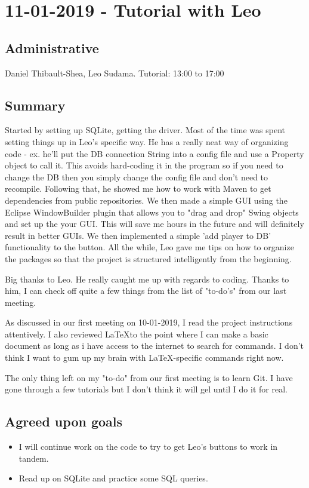 \documentclass[12pt]{article}
\begin{document}
	\section{11-01-2019 - Tutorial with Leo}
	
	\subsection{Administrative}
	Daniel Thibault-Shea, Leo Sudama.
	Tutorial: 13:00 to 17:00
	
	\subsection{Summary}
	Started by setting up SQLite, getting the driver. Most of the time was spent setting things up in Leo's specific way. He has a really neat way of organizing code - ex. he'll put the DB connection String into a config file and use a Property object to call it. This avoids hard-coding it in the program so if you need to change the DB then you simply change the config file and don't need to recompile. Following that, he showed me how to work with Maven to get dependencies from public repositories. We then made a simple GUI using the Eclipse WindowBuilder plugin that allows you to "drag and drop" Swing objects and set up the your GUI. This will save me hours in the future and will definitely result in better GUIs. We then implemented a simple 'add player to DB' functionality to the button. All the while, Leo gave me tips on how to organize the packages so that the project is structured intelligently from the beginning.
	
	Big thanks to Leo. He really caught me up with regards to coding. Thanks to him, I can check off quite a few things from the list of "to-do's" from our last meeting.
	
	As discussed in our first meeting on 10-01-2019, I read the project instructions attentively. I also reviewed \LaTeX to the point where I can make a basic document as long as i have access to the internet to search for commands. I don't think I want to gum up my brain with \LaTeX -specific commands right now.
	
	The only thing left on my "to-do" from our first meeting is to learn Git. I have gone through a few tutorials but I don't think it will gel until I do it for real.
	
	\subsection{Agreed upon goals}
	\begin{itemize}
		\item I will continue work on the code to try to get Leo's buttons to work in tandem.
		\item Read up on SQLite and practice some SQL queries.
	\end{itemize}
	
\end{document}
